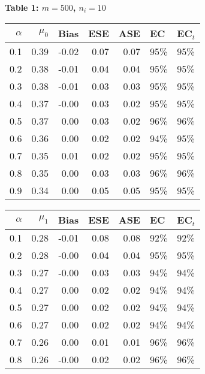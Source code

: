\documentclass[12pt, letterpaper]{article}
\begin{document}


\begin{center}
	\textbf{Table 1: $m=500$, $n_i=10$} 
\end{center}
\begin{table}[ht!]
	\centering
	\bgroup
	\def\arraystretch{1.25}
	\setlength\tabcolsep{0.05in}
	\begin{tabular}{rrrrrll}
		\hline
		$\alpha$ & $\mu_0$ & Bias & ESE & ASE & EC & EC$_t$ \\ \hline 
		0.1 & 0.39 & -0.02 & 0.07 & 0.07 & 95\% & 95\% \\ 
		0.2 & 0.38 & -0.01 & 0.04 & 0.04 & 95\% & 95\% \\ 
		0.3 & 0.38 & -0.01 & 0.03 & 0.03 & 95\% & 95\% \\ 
		0.4 & 0.37 & -0.00 & 0.03 & 0.02 & 95\% & 95\% \\ 
		0.5 & 0.37 & 0.00 & 0.03 & 0.02 & 96\% & 96\% \\ 
		0.6 & 0.36 & 0.00 & 0.02 & 0.02 & 94\% & 95\% \\ 
		0.7 & 0.35 & 0.01 & 0.02 & 0.02 & 95\% & 95\% \\ 
		0.8 & 0.35 & 0.00 & 0.03 & 0.03 & 96\% & 96\% \\ 
		0.9 & 0.34 & 0.00 & 0.05 & 0.05 & 95\% & 95\% \\ 
		\hline
	\end{tabular}
	\egroup
	\quad 
	\bgroup
	\setlength\tabcolsep{0.05in}
	\def\arraystretch{1.25}
	\begin{tabular}{rrrrrll}
		\hline
		$\alpha$ & $\mu_1$ & Bias & ESE & ASE & EC & EC$_t$ \\ \hline
	0.1 & 0.28 & -0.01 & 0.08 & 0.08 & 92\% & 92\% \\ 
	0.2 & 0.28 & -0.00 & 0.04 & 0.04 & 95\% & 95\% \\ 
	0.3 & 0.27 & -0.00 & 0.03 & 0.03 & 94\% & 94\% \\ 
	0.4 & 0.27 & 0.00 & 0.02 & 0.02 & 94\% & 94\% \\ 
	0.5 & 0.27 & 0.00 & 0.02 & 0.02 & 94\% & 94\% \\ 
	0.6 & 0.27 & 0.00 & 0.02 & 0.02 & 94\% & 94\% \\ 
	0.7 & 0.26 & 0.00 & 0.01 & 0.01 & 96\% & 96\% \\ 
	0.8 & 0.26 & -0.00 & 0.02 & 0.02 & 96\% & 96\% \\ 

\end{tabular}
\end{table}
\end{document}
